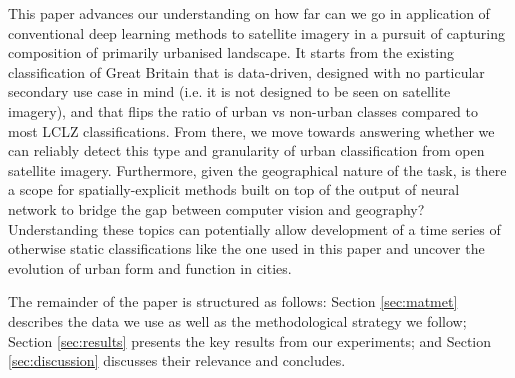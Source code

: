 This paper advances our understanding on how far can we go in application of
conventional deep learning methods to satellite imagery in a pursuit of capturing
composition of primarily urbanised landscape. It starts from the existing classification
of Great Britain that is data-driven, designed with no particular secondary use case in
mind (i.e. it is not designed to be seen on satellite imagery), and that flips the ratio
of urban vs non-urban classes compared to most LCLZ classifications. From there, we move
towards answering whether we can reliably detect this type and granularity of urban
classification from open satellite imagery. Furthermore, given the geographical nature
of the task, is there a scope for spatially-explicit methods built on top of the output
of neural network to bridge the gap between computer vision and geography? Understanding
these topics can potentially allow development of a time series of otherwise static
classifications like the one used in this paper and uncover the evolution of urban form
and function in cities.

%
The remainder of the paper is structured as follows:
Section \ref{sec:matmet} describes the data we use as well as the
methodological strategy we follow;
Section \ref{sec:results} presents the key results from our experiments;
and Section \ref{sec:discussion} discusses their relevance and concludes.






